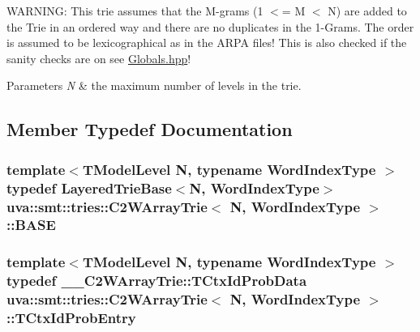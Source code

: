 W\+A\+R\+N\+I\+N\+G\+: This trie assumes that the M-\/grams (1 $<$= M $<$ N) are added to the Trie in an ordered way and there are no duplicates in the 1-\/\+Grams. The order is assumed to be lexicographical as in the A\+R\+P\+A files! This is also checked if the sanity checks are on see \hyperlink{_globals_8hpp}{Globals.\+hpp}!


\begin{DoxyParams}{Parameters}
{\em N} & the maximum number of levels in the trie. \\
\hline
\end{DoxyParams}


\subsection{Member Typedef Documentation}
\hypertarget{classuva_1_1smt_1_1tries_1_1_c2_w_array_trie_a9891b271388cf50ce1344b05e70f6158}{}
\subsubsection[{B\+A\+S\+E}]{\setlength{\rightskip}{0pt plus 5cm}template$<$T\+Model\+Level N, typename Word\+Index\+Type $>$ typedef {\bf Layered\+Trie\+Base}$<$N, {\bf Word\+Index\+Type}$>$ {\bf uva\+::smt\+::tries\+::\+C2\+W\+Array\+Trie}$<$ N, {\bf Word\+Index\+Type} $>$\+::{\bf B\+A\+S\+E}}\label{classuva_1_1smt_1_1tries_1_1_c2_w_array_trie_a9891b271388cf50ce1344b05e70f6158}
\hypertarget{classuva_1_1smt_1_1tries_1_1_c2_w_array_trie_a23dd42dc1e2c2270217b7a0692740082}{}
\subsubsection[{T\+Ctx\+Id\+Prob\+Entry}]{\setlength{\rightskip}{0pt plus 5cm}template$<$T\+Model\+Level N, typename Word\+Index\+Type $>$ typedef {\bf \+\_\+\+\_\+\+C2\+W\+Array\+Trie\+::\+T\+Ctx\+Id\+Prob\+Data} {\bf uva\+::smt\+::tries\+::\+C2\+W\+Array\+Trie}$<$ N, {\bf Word\+Index\+Type} $>$\+::{\bf T\+Ctx\+Id\+Prob\+Entry}\hspace{0.3cm}{\ttfamily [protected]}}\label{classuva_1_1smt_1_1tries_1_1_c2_w_array_trie_a23dd42dc1e2c2270217b7a0692740082}
\hypertarget{classuva_1_1smt_1_1tries_1_1_c2_w_array_trie_a8682efe5667cc07ac24d2f682a707ed9}{}
